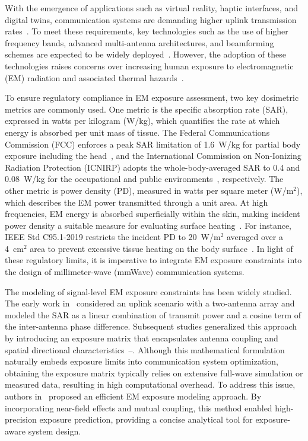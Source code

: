 \documentclass[journal]{IEEEtran}
\begin{document}
With the emergence of applications such as virtual reality, haptic interfaces, and digital twins, communication systems are demanding higher uplink transmission rates~\cite{ref1}. To meet these requirements, key technologies such as the use of higher frequency bands, advanced multi-antenna architectures, and beamforming schemes are expected to be widely deployed~\cite{ref2}. However, the adoption of these technologies raises concerns over increasing human exposure to electromagnetic (EM) radiation and associated thermal hazards~\cite{ref3}.

To ensure regulatory compliance in EM exposure assessment, two key dosimetric metrics are commonly used. One metric is the specific absorption rate (SAR), expressed in watts per kilogram (W/kg), which quantifies the rate at which energy is absorbed per unit mass of tissue. The Federal Communications Commission (FCC) enforces a peak SAR limitation of 1.6~W/kg for partial body exposure including the head~\cite{ref5}, and the International Commission on Non-Ionizing Radiation Protection (ICNIRP) adopts the whole-body-averaged SAR to 0.4 and 0.08~W/kg for the occupational and public environments~\cite{ref6}, respectively. The other metric is power density (PD), measured in watts per square meter (W/m$^2$), which describes the EM power transmitted through a unit area. At high frequencies, EM energy is absorbed superficially within the skin, making incident power density a suitable measure for evaluating surface heating~\cite{ref7}. For instance, IEEE Std C95.1-2019 restricts the incident PD to 20~W/m$^2$ averaged over a 4~cm$^2$ area to prevent excessive tissue heating on the body surface~\cite{ref8}. In light of these regulatory limits, it is imperative to integrate EM exposure constraints into the design of millimeter-wave (mmWave) communication systems.

The modeling of signal-level EM exposure constraints has been widely studied. The early work in~\cite{ref9} considered an uplink scenario with a two-antenna array and modeled the SAR as a linear combination of transmit power and a cosine term of the inter-antenna phase difference. Subsequent studies generalized this approach by introducing an exposure matrix that encapsulates antenna coupling and spatial directional characteristics~\cite{ref10}--\cite{ref12}. Although this mathematical formulation naturally embeds exposure limits into communication system optimization, obtaining the exposure matrix typically relies on extensive full-wave simulation or measured data, resulting in high computational overhead. To address this issue, authors in~\cite{ref13} proposed an efficient EM exposure modeling approach. By incorporating near-field effects and mutual coupling, this method enabled high-precision exposure prediction, providing a concise analytical tool for exposure-aware system design.
\end{document}
